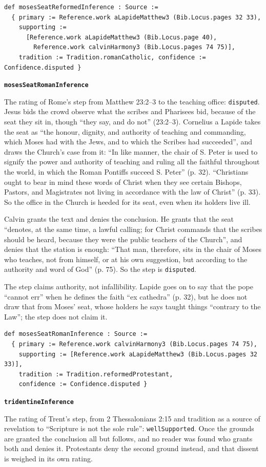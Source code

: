 \documentclass[11pt]{article}
\begin{document}
{\small\begin{verbatim}
def mosesSeatReformedInference : Source :=
  { primary := Reference.work aLapideMatthew3 (Bib.Locus.pages 32 33),
    supporting :=
      [Reference.work aLapideMatthew3 (Bib.Locus.page 40),
        Reference.work calvinHarmony3 (Bib.Locus.pages 74 75)],
    tradition := Tradition.romanCatholic, confidence := Confidence.disputed }
\end{verbatim}}
\par\medskip\noindent\textbf{\texttt{moses\allowbreak{}Seat\allowbreak{}Roman\allowbreak{}Inference}}\par\nobreak\noindent
The rating of Rome’s step from Matthew 23:2–3 to the teaching office: \texttt{disputed}. Jesus bids the crowd observe what the scribes and Pharisees bid, because of the seat they sit in, though “they say, and do not” (23:2–3). Cornelius a Lapide takes the seat as “the honour, dignity, and authority of teaching and commanding, which Moses had with the Jews, and to which the Scribes had succeeded”, and draws the Church’s case from it: “In like manner, the chair of S. Peter is used to signify the power and authority of teaching and ruling all the faithful throughout the world, in which the Roman Pontiffs succeed S. Peter” (p. 32). “Christians ought to bear in mind these words of Christ when they see certain Bishops, Pastors, and Magistrates not living in accordance with the law of Christ” (p. 33). So the office in the Church is heeded for its seat, even when its holders live ill.

Calvin grants the text and denies the conclusion. He grants that the seat “denotes, at the same time, a lawful calling; for Christ commands that the scribes should be heard, because they were the public teachers of the Church”, and denies that the station is enough: “That man, therefore, sits in the chair of Moses who teaches, not from himself, or at his own suggestion, but according to the authority and word of God” (p. 75). So the step is \texttt{disputed}.

The step claims authority, not infallibility. Lapide goes on to say that the pope “cannot err” when he defines the faith “ex cathedra” (p. 32), but he does not draw that from Moses’ seat, whose holders he says taught things “contrary to the Law”; the step does not claim it.

{\small\begin{verbatim}
def mosesSeatRomanInference : Source :=
  { primary := Reference.work calvinHarmony3 (Bib.Locus.pages 74 75),
    supporting := [Reference.work aLapideMatthew3 (Bib.Locus.pages 32 33)],
    tradition := Tradition.reformedProtestant,
    confidence := Confidence.disputed }
\end{verbatim}}
\par\medskip\noindent\textbf{\texttt{tridentine\allowbreak{}Inference}}\par\nobreak\noindent
The rating of Trent’s step, from 2 Thessalonians 2:15 and tradition as a source of revelation to “Scripture is not the sole rule”: \texttt{well\allowbreak{}Supported}. Once the grounds are granted the conclusion all but follows, and no reader was found who grants both and denies it. Protestants deny the second ground instead, and that dissent is weighed in its own rating.
\end{document}
